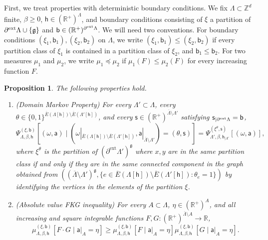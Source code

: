 \documentclass[11pt,a4paper]{article}
\numberwithin{equation}{section}
\theoremstyle{plain}
\newtheorem{Prop}[Thm]{Proposition}
\theoremstyle{definition}
\newcommand\fg{\mathfrak{g}}
\begin{document}
First, we treat properties with deterministic boundary conditions. We fix $\Lambda \subset \mathbb Z^d$ finite, $\beta \geq 0$, $\mathsf h \in (\mathbb R^+)^\Lambda$, and boundary conditions consisting of $\xi$ a partition of $\partial^{\textup{ext}} \Lambda\cup \{\fg\}$ and $\mathsf b \in (\mathbb R^+)^{\partial^{\textup{ext}} \Lambda}$. We will need two conventions. For boundary conditions $(\xi_1,\mathsf{b}_1), (\xi_2,\mathsf{b}_2)$ on $\Lambda$, we write $(\xi_1,\mathsf{b}_1) \leq (\xi_2,\mathsf{b}_2)$ if every partition class of $\xi_1$ is contained in a partition class of $\xi_2$, and $\mathsf{b}_1\leq \mathsf{b}_2$. For two measures $\mu_1$ and $\mu_2$, we write $\mu_1 \preccurlyeq \mu_2$ if $\mu_1(F)\leq \mu_2(F)$ for every increasing function $F$.
\begin{Prop}\label{prop: random cluster properties}
The following properties hold.
\begin{enumerate}
\item[$\bullet$]\textup{(Domain Markov Property)} For every $\Lambda' \subset \Lambda$, every $\theta\in \{0,1\}^{\overline E(\Lambda[\mathsf{h}]) \setminus \overline E(\Lambda'[\mathsf{h}])}$, and every $\mathsf{s}\in (\mathbb R^+)^{\overline{\Lambda}\setminus\Lambda'}$ satisfying $\mathsf{s}_{|\partial^{\textup{ext}} \Lambda}=\mathsf{b}$,
\begin{equation}
\Psi^{(\xi,\mathsf{b})}_{\Lambda,\beta,\mathsf{h}}[(\omega,\mathsf{a}) \mid (\omega|_{\overline E(\Lambda[\mathsf{h}])\setminus \overline E(\Lambda'[\mathsf{h}])},\mathsf{a}|_{\overline{\Lambda}\setminus \Lambda'})=(\theta,\mathsf{s})]=\Psi^{(\xi^{\theta},\mathsf{s})}_{\Lambda',\beta,\mathsf{h}_{|\Lambda'}}[(\omega,\mathsf{a})],
\end{equation}
where $\xi^{\theta}$ is the partition of $(\partial^{\mathrm{ext}} \Lambda')^{\fg}$ where $x,y$ are in the same partition class if and only if they are in the same connected component in the graph obtained from  $((\overline{\Lambda}\setminus \Lambda')^{\mathfrak g}, \{ e \in \overline E(\Lambda[\mathsf h])\setminus \overline E(\Lambda'[\mathsf h]):\theta_e=1\})$ by identifying the vertices in the elements of the partition $\xi$.
\item[$\bullet$]\textup{(Absolute value FKG inequality)} For every  $A \subset \Lambda$, $\eta \in (\mathbb R^+)^A$, and all increasing and square integrable functions $F,G: (\mathbb{R}^+)^{\overline{\Lambda} \setminus A}\to\mathbb{R}$, 
\begin{equation} \label{eq: conditional abs fkg}
\mu_{\Lambda,\beta,\mathsf{h}}^{(\xi,\mathsf{b})}[F\cdot G \mid \mathsf a|_A=\eta]\geq \mu_{\Lambda,\beta,\mathsf{h}}^{(\xi,\mathsf{b})}[F \mid \mathsf a|_A=\eta]\mu_{\Lambda,\beta,\mathsf{h}}^{(\xi,\mathsf{b})}[G \mid \mathsf a|_A=\eta].

\end{equation}
\end{enumerate}
\end{Prop}
\end{document}
